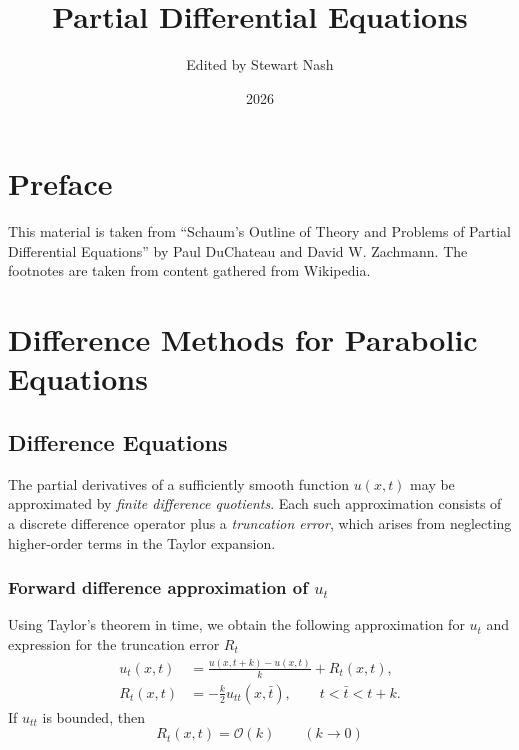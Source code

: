 \documentclass[11pt]{book}
\theoremstyle{example}
\theoremstyle{problem}
\theoremstyle{theorem}
\theoremstyle{definition}
\begin{document}
\title{Partial Differential Equations}
\author{Edited by Stewart Nash}
\date{2026}

\frontmatter

\maketitle

\chapter*{Preface}
This material is taken from ``Schaum's Outline of Theory and Problems of Partial Differential Equations'' by Paul DuChateau and David W. Zachmann. The footnotes are taken from content gathered from Wikipedia.

\tableofcontents

\mainmatter

\chapter[DM for Parabolic Equations]{Difference Methods for Parabolic Equations}

\section{Difference Equations}
The partial derivatives of a sufficiently smooth function $u(x,t)$ may be approximated by \emph{finite difference quotients}. Each such approximation consists of a discrete difference operator plus a \emph{truncation error}, which arises from neglecting higher-order terms in the Taylor expansion. 
\subsection{Forward difference approximation of $u_t$}
Using Taylor's theorem in time, we obtain the following approximation for $u_t$ and expression for the truncation error $R_t$
\begin{align}
	u_t(x,t)&=\frac{u(x,t+k)-u(x,t)}{k}+R_t(x,t),\\
	R_t(x,t)&=-\frac{k}{2}u_{tt}(x,\bar{t}),\qquad{t<\bar{t}<t+k}.
	\tag{Forward Difference for $u_t$}
\end{align}
If $u_{tt}$ is bounded, then
\begin{equation*}
	R_t(x,t)=\mathcal{O}(k)\qquad(k\rightarrow0)
\end{equation*}
\end{document}

